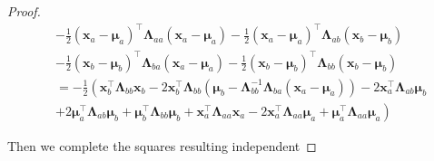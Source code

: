 \begin{appendices}
\begin{proof}
    \begin{equation*}
    \begin{aligned} &-\frac{1}{2}\left(\mathbf{x}_{a}-\boldsymbol{\mu}_{a}\right)^\top \boldsymbol{\Lambda}_{a a}\left(\mathbf{x}_{a}-\boldsymbol{\mu}_{a}\right)-\frac{1}{2}\left(\mathbf{x}_{a}-\boldsymbol{\mu}_{a}\right)^\top \boldsymbol{\Lambda}_{a b}\left(\mathbf{x}_{b}-\boldsymbol{\mu}_{b}\right) \\ &-\frac{1}{2}\left(\mathbf{x}_{b}-\boldsymbol{\mu}_{b}\right)^\top \boldsymbol{\Lambda}_{b a}\left(\mathbf{x}_{a}-\boldsymbol{\mu}_{a}\right)-\frac{1}{2}\left(\mathbf{x}_{b}-\boldsymbol{\mu}_{b}\right)^\top \boldsymbol{\Lambda}_{b b}\left(\mathbf{x}_{b}-\boldsymbol{\mu}_{b}\right) \\ &=-\frac{1}{2}\left(\mathbf{x}_{b}^\top \boldsymbol{\Lambda}_{b b} \mathbf{x}_{b}-2 \mathbf{x}_{b}^\top \boldsymbol{\Lambda}_{b b}\left(\boldsymbol{\mu}_{b}-\boldsymbol{\Lambda}_{b b}^{-1} \boldsymbol{\Lambda}_{b a}\left(\mathbf{x}_{a}-\boldsymbol{\mu}_{a}\right)\right)-2 \mathbf{x}_{a}^\top \boldsymbol{\Lambda}_{a b} \boldsymbol{\mu}_{b}\right.\\ & \left.  +2 \boldsymbol{\mu}_{a}^\top \boldsymbol{\Lambda}_{a b} \boldsymbol{\mu}_{b}+\boldsymbol{\mu}_{b}^\top \boldsymbol{\Lambda}_{b b} \boldsymbol{\mu}_{b}+\mathbf{x}_{a}^\top \boldsymbol{\Lambda}_{a a} \mathbf{x}_{a}-2 \mathbf{x}_{a}^\top \boldsymbol{\Lambda}_{a a} \boldsymbol{\mu}_{a}+\boldsymbol{\mu}_{a}^\top \boldsymbol{\Lambda}_{a a} \boldsymbol{\mu}_{a} \right) \end{aligned}
    \end{equation*}

    Then we complete the squares resulting independent


\end{proof}
\end{appendices}
